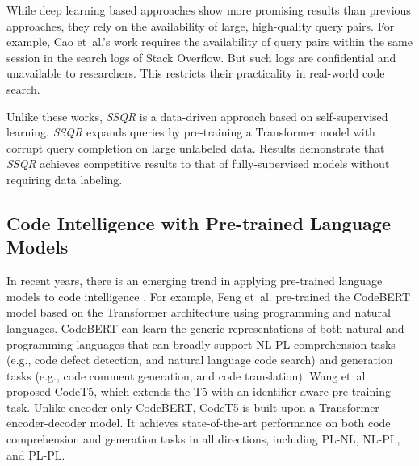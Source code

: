\documentclass[sigconf,screen]{acmart}
\newcommand{\etal}{\hbox{et al.}\xspace}
\newcommand{\eg}{\hbox{e.g.}\xspace}
\newcommand{\ourmethod}{\textit{SSQR}\xspace}
\begin{document}
While deep learning based approaches show more promising results than previous approaches, they rely on the availability of large, high-quality query pairs. For example, Cao \etal's work requires the availability of query pairs within the same session in the search logs of Stack Overflow. But such logs are confidential and unavailable to researchers. This restricts their practicality in real-world code search.

Unlike these works, \ourmethod is a data-driven approach based on self-supervised learning. \ourmethod expands queries by pre-training a Transformer model with corrupt query completion on large unlabeled data. Results demonstrate that \ourmethod achieves competitive results to that of fully-supervised models without requiring data labeling.


\subsection{Code Intelligence with Pre-trained Language Models}

In recent years, there is an emerging trend in applying pre-trained language models to code intelligence \cite{feng2020codebert,wang2021codet5,niu2022spt,hadi2022effectiveness}. 
For example, Feng \etal\cite{feng2020codebert} pre-trained the CodeBERT model based on the Transformer architecture using programming and natural languages. %
CodeBERT can learn the generic representations of both natural and programming languages that can broadly support NL-PL comprehension tasks (\eg, code defect detection, and natural language code search) and generation tasks (\eg, code comment generation, and code translation). Wang \etal~\cite{wang2021codet5} proposed CodeT5, which extends the T5 with an identifier-aware pre-training task. Unlike encoder-only CodeBERT, CodeT5 is built upon a Transformer encoder-decoder model. It achieves state-of-the-art performance on both code comprehension and generation tasks in all directions, including PL-NL, NL-PL, and PL-PL. %
\end{document}
